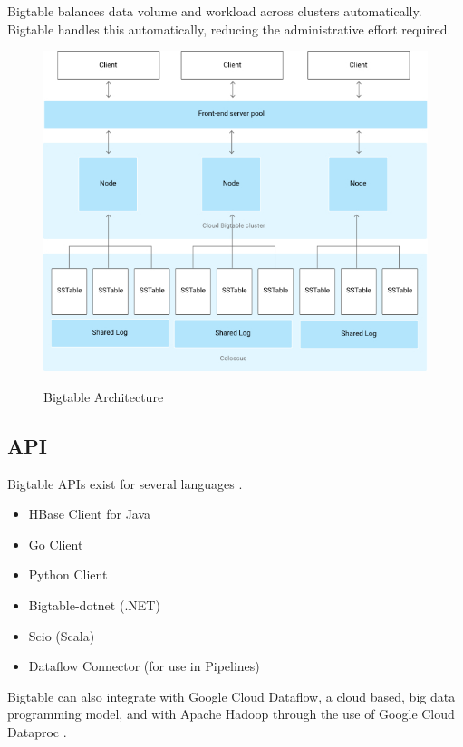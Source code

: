 \documentclass[9pt,twocolumn,twoside]{styles/osajnl}
\begin{document}
Bigtable balances data volume and workload across clusters automatically. Bigtable handles this automatically, reducing the administrative effort required\cite{www-bigtabledocoverview}.


\vspace{-\topsep}


\begin{figure}[ht]
  \includegraphics[scale=0.45]{images/bigtable-architecture.jpg}
  \caption{Bigtable Architecture} \cite{www-bigtabledocoverview}
\end{figure}

\subsection{API}

Bigtable APIs exist for several languages \cite{www-bigtabledocapi}.

\vspace{-\topsep}
\begin{itemize}
\item HBase Client for Java
\item Go Client
\item Python Client
\item Bigtable-dotnet (.NET)
\item Scio (Scala)
\item Dataflow Connector (for use in Pipelines)
\end{itemize}

Bigtable can also integrate with Google Cloud Dataflow, a cloud based, big data programming model, and with Apache Hadoop through the use of Google Cloud Dataproc \cite{www-bigtabledocapi}.
\end{document}
